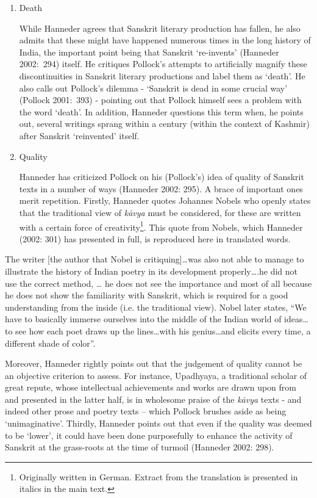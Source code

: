 \begin{enumerate}
\item Death 

 While Hanneder agrees that Sanskrit literary production has fallen, he also admits that these might have happened numerous times in the long history of India, the important point being that Sanskrit ‘re-invents’ (Hanneder 2002:~294) itself. He critiques Pollock’s attempts to artificially magnify these discontinuities in Sanskrit literary productions and label them as ‘death’. He also calls out Pollock’s dilemma - ‘Sanskrit is dead in some crucial way’ (Pollock 2001:~393) - pointing out that Pollock himself sees a problem with the word ‘death’. In addition, Hanneder questions this term when, he points out, several writings sprang within a century (within the context of Kashmir) after Sanskrit ‘reinvented’ itself.

 \item Quality 
 
 Hanneder has criticized Pollock on his (Pollock’s) idea of quality of Sanskrit texts in a number of ways (Hanneder 2002: 295). A brace of important ones merit repetition. Firstly, Hanneder quotes Johannes Nobels who openly states that the traditional view of \textit{kāvya} must be considered, for these are written with a certain force of creativity\footnote{ Originally written in German. Extract from the translation is presented in italics in the main text.}. This quote from Nobels, which Hanneder (2002: 301) has presented in full, is reproduced here in translated words.
\end{enumerate}

\begin{myquote}
The writer [the author that Nobel is critiquing]…was also not able to manage to illustrate the history of Indian poetry in its development properly….he did not use the correct method, … he does not see the importance and most of all because he does not show the familiarity with Sanskrit, which is required for a good understanding from the inside (i.e. the traditional view). Nobel later states, “We have to basically immerse ourselves into the middle of the Indian world of ideas…to see how each poet draws up the lines…with his genius…and elicits every time, a different shade of color”.
\end{myquote}

Moreover, Hanneder rightly points out that the judgement of quality cannot be an objective criterion to assess. For instance, Upadhyaya, a traditional scholar of great repute, whose intellectual achievements and works are drawn upon from and presented in the latter half, is in wholesome praise of the \textit{kāvya} texts - and indeed other prose and poetry texts – which Pollock brushes aside as being ‘unimaginative’. Thirdly, Hanneder points out that even if the quality was deemed to be ‘lower’, it could have been done purposefully to enhance the activity of Sanskrit at the grass-roots at the time of turmoil (Hanneder 2002: 298).

